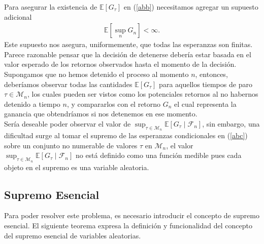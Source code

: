 Para asegurar la existencia de $\mathbb{E}[G_\tau]$ en (\ref{abb}) necesitamos agregar un supuesto adicional
	\begin{align}
	\mathbb{E} \left[ \sup_n G_n \right] < \infty. \label{abc}
	\end{align}
Este supuesto nos asegura, uniformemente, que todas las esperanzas son finitas.  \\

Parece razonable pensar que la decisión de detenerse debería estar basada en el valor esperado de los retornos observados hasta el momento de la decisión. Supongamos que no hemos detenido el proceso al momento $n$, entonces, deberíamos observar todas las cantidades $\mathbb{E}[G_\tau]$ para aquellos tiempos de paro $\tau \in \mathcal{M}_n$, los cuales pueden ser vistos como los potenciales retornos al no habernos detenido a tiempo $n$, y compararlos con el retorno $G_n$ el cual representa la ganancia que obtendríamos si nos detenemos en ese momento. \\

Sería deseable poder observar el valor de $\sup_{\tau \in \mathcal{M}_n} \mathbb{E}[G_\tau \mid \mathcal{F}_n]$, sin embargo, una dificultad surge al tomar el supremo de las esperanzas condicionales en (\ref{abc}) sobre un conjunto no numerable de valores $\tau$ en $\mathcal{M}_n$, el valor $\sup_{\tau \in \mathcal{M}_n} \mathbb{E}[G_\tau \mid \mathcal{F}_n]$ no está definido como una función medible pues cada objeto en el supremo es una variable aleatoria. \\

\subsection{Supremo Esencial}

Para poder resolver este problema, es necesario introducir el concepto de supremo esencial. El siguiente teorema expresa la definición y funcionalidad del concepto del supremo esencial de variables aleatorias.

